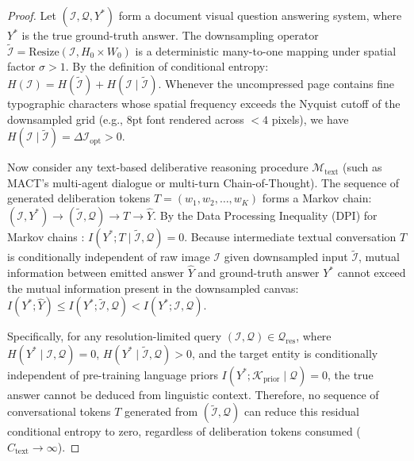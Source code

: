\documentclass[11pt]{article}
\begin{document}
\begin{proof}
Let $(\mathcal{I}, \mathcal{Q}, Y^*)$ form a document visual question answering system, where $Y^*$ is the true ground-truth answer. The downsampling operator $\tilde{\mathcal{I}} = \text{Resize}(\mathcal{I}, H_0 \times W_0)$ is a deterministic many-to-one mapping under spatial factor $\sigma > 1$. By the definition of conditional entropy: $H(\mathcal{I}) = H(\tilde{\mathcal{I}}) + H(\mathcal{I} \mid \tilde{\mathcal{I}})$. Whenever the uncompressed page contains fine typographic characters whose spatial frequency exceeds the Nyquist cutoff of the downsampled grid (e.g., 8pt font rendered across $< 4$ pixels), we have $H(\mathcal{I} \mid \tilde{\mathcal{I}}) = \Delta \mathcal{I}_{\text{opt}} > 0$.

Now consider any text-based deliberative reasoning procedure $\mathcal{M}_{\text{text}}$ (such as MACT's multi-agent dialogue or multi-turn Chain-of-Thought). The sequence of generated deliberation tokens $T = (w_1, w_2, \dots, w_K)$ forms a Markov chain: $(\mathcal{I}, Y^*) \longrightarrow (\tilde{\mathcal{I}}, \mathcal{Q}) \longrightarrow T \longrightarrow \hat{Y}$. By the Data Processing Inequality (DPI) for Markov chains \citep{cover1991elements}: $I(Y^*; T \mid \tilde{\mathcal{I}}, \mathcal{Q}) = 0$. Because intermediate textual conversation $T$ is conditionally independent of raw image $\mathcal{I}$ given downsampled input $\tilde{\mathcal{I}}$, mutual information between emitted answer $\hat{Y}$ and ground-truth answer $Y^*$ cannot exceed the mutual information present in the downsampled canvas: $I(Y^*; \hat{Y}) \le I(Y^*; \tilde{\mathcal{I}}, \mathcal{Q}) < I(Y^*; \mathcal{I}, \mathcal{Q})$.

Specifically, for any resolution-limited query $(\mathcal{I}, \mathcal{Q}) \in \mathcal{Q}_{\text{res}}$, where $H(Y^* \mid \mathcal{I}, \mathcal{Q}) = 0$, $H(Y^* \mid \tilde{\mathcal{I}}, \mathcal{Q}) > 0$, and the target entity is conditionally independent of pre-training language priors $I(Y^*; \mathcal{K}_{\text{prior}} \mid \mathcal{Q}) = 0$, the true answer cannot be deduced from linguistic context. Therefore, no sequence of conversational tokens $T$ generated from $(\tilde{\mathcal{I}}, \mathcal{Q})$ can reduce this residual conditional entropy to zero, regardless of deliberation tokens consumed ($C_{\text{text}} \to \infty$).


\end{proof}
\end{document}

